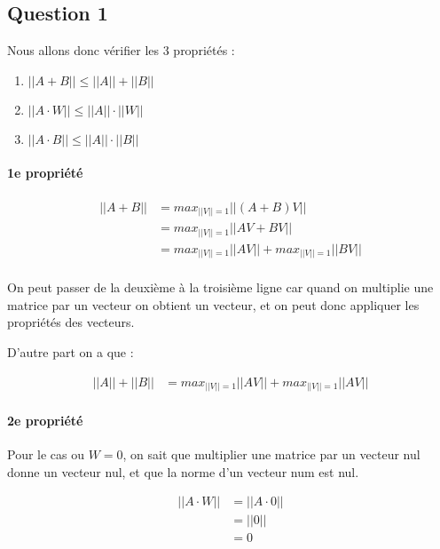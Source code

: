 \subsection{Question 1}

Nous allons donc vérifier les 3 propriétés :

\begin{enumerate}
    \item $||A + B|| \leq ||A|| + ||B||$
    \item $||A \cdot W|| \leq ||A|| \cdot ||W||$
    \item $||A \cdot B|| \leq ||A|| \cdot ||B||$
\end{enumerate}

\paragraph{1e propriété}

\begin{equation}
	\begin{aligned}
		||A + B|| &= max_{||V||=1}||(A + B)V||\\
		&= max_{||V||=1}||AV + BV||\\
		&= max_{||V||=1}||AV|| + max_{||V||=1}||BV||\\
	\end{aligned}
\end{equation}

On peut passer de la deuxième à la troisième ligne car quand on multiplie une matrice par un vecteur on obtient un vecteur, et on peut donc appliquer les propriétés des vecteurs.

D'autre part on a que :

\begin{equation}
	\begin{aligned}
		||A|| + ||B|| &= max_{||V||=1}||AV|| + max_{||V||=1}||AV||
	\end{aligned}
\end{equation}

\paragraph{2e propriété}

Pour le cas ou $W = 0$, on sait que multiplier une matrice par un vecteur nul donne un vecteur nul, et que la norme d'un vecteur num est nul.

\begin{equation}
	\begin{aligned}
		||A \cdot W|| &= ||A \cdot 0||\\
		&= ||0||\\
		&= 0
	\end{aligned}
\end{equation}


